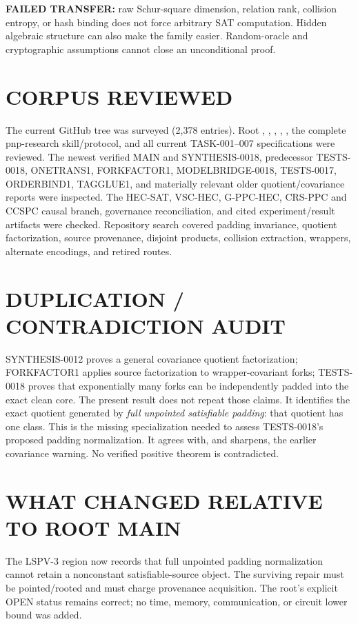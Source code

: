 \documentclass[11pt]{article}
\begin{document}
\textbf{FAILED TRANSFER:} raw Schur-square dimension, relation rank, collision
entropy, or hash binding does not force arbitrary SAT computation.  Hidden
algebraic structure can also make the family easier.  Random-oracle and
cryptographic assumptions cannot close an unconditional proof.

\section{CORPUS REVIEWED}

The current GitHub tree was surveyed (2,378 entries).  Root
, , , ,
, the complete pnp-research skill/protocol, and all current
TASK-001--007 specifications were reviewed.  The newest verified MAIN and
SYNTHESIS-0018, predecessor TESTS-0018, ONETRANS1, FORKFACTOR1,
MODELBRIDGE-0018, TESTS-0017, ORDERBIND1, TAGGLUE1, and materially relevant
older quotient/covariance reports were inspected.  The HEC-SAT, VSC-HEC,
G-PPC-HEC, CRS-PPC and CCSPC causal branch, governance reconciliation, and
cited experiment/result artifacts were checked.  Repository search covered
padding invariance, quotient factorization, source provenance, disjoint
products, collision extraction, wrappers, alternate encodings, and retired
routes.

\section{DUPLICATION / CONTRADICTION AUDIT}

SYNTHESIS-0012 proves a general covariance quotient factorization;
FORKFACTOR1 applies source factorization to wrapper-covariant forks;
TESTS-0018 proves that exponentially many forks can be independently padded
into the exact clean core.  The present result does not repeat those claims.
It identifies the exact quotient generated by \emph{full unpointed
satisfiable padding}: that quotient has one class.  This is the missing
specialization needed to assess TESTS-0018's proposed padding normalization.
It agrees with, and sharpens, the earlier covariance warning.  No verified
positive theorem is contradicted.

\section{WHAT CHANGED RELATIVE TO ROOT MAIN}

The LSPV-3 region now records that full unpointed padding normalization cannot
retain a nonconstant satisfiable-source object.  The surviving repair must be
pointed/rooted and must charge provenance acquisition.  The root's explicit
OPEN status remains correct; no time, memory, communication, or circuit lower
bound was added.
\end{document}
